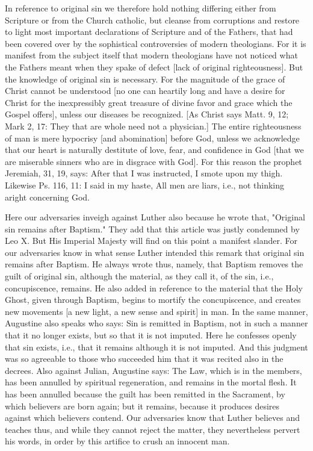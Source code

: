 In reference to original sin we therefore hold nothing differing
either from Scripture or from the Church catholic, but cleanse from
corruptions and restore to light most important declarations of
Scripture and of the Fathers, that had been covered over by the
sophistical controversies of modern theologians.  For it is manifest
from the subject itself that modern theologians have not noticed what
the Fathers meant when they spake of defect [lack of original
righteousness].  But the knowledge of original sin is necessary.  For
the magnitude of the grace of Christ cannot be understood [no one can
heartily long and have a desire for Christ for the inexpressibly
great treasure of divine favor and grace which the Gospel offers],
unless our diseases be recognized.  [As Christ says Matt. 9, 12; Mark
2, 17: They that are whole need not a physician.] The entire
righteousness of man is mere hypocrisy [and abomination] before God,
unless we acknowledge that our heart is naturally destitute of love,
fear, and confidence in God [that we are miserable sinners who are in
disgrace with God].  For this reason the prophet Jeremiah, 31, 19,
says: After that I was instructed, I smote upon my thigh.  Likewise
Ps. 116, 11: I said in my haste, All men are liars, i.e., not
thinking aright concerning God.

Here our adversaries inveigh against Luther also because he wrote
that, "Original sin remains after Baptism." They add that this
article was justly condemned by Leo X. But His Imperial Majesty will
find on this point a manifest slander.  For our adversaries know in
what sense Luther intended this remark that original sin remains
after Baptism.  He always wrote thus, namely, that Baptism removes
the guilt of original sin, although the material, as they call it, of
the sin, i.e., concupiscence, remains.  He also added in reference to
the material that the Holy Ghost, given through Baptism, begins to
mortify the concupiscence, and creates new movements [a new light, a
new sense and spirit] in man.  In the same manner, Augustine also
speaks who says: Sin is remitted in Baptism, not in such a manner
that it no longer exists, but so that it is not imputed.  Here he
confesses openly that sin exists, i.e., that it remains although it
is not imputed.  And this judgment was so agreeable to those who
succeeded him that it was recited also in the decrees.  Also against
Julian, Augustine says: The Law, which is in the members, has been
annulled by spiritual regeneration, and remains in the mortal flesh.
It has been annulled because the guilt has been remitted in the
Sacrament, by which believers are born again; but it remains, because
it produces desires against which believers contend.  Our adversaries
know that Luther believes and teaches thus, and while they cannot
reject the matter, they nevertheless pervert his words, in order by
this artifice to crush an innocent man.

